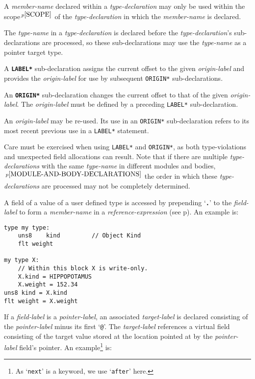 \documentclass[12pt]{article}
\newcommand{\TT}[1]{{\tt \bfseries #1}}
\newcommand{\ttkey}[1]{{\tt \bfseries #1}}
\newcommand{\pagref}[1]{p\pageref{#1}}
\newcommand{\pagnote}[1]{$\,^{p\pageref{#1}}$}
\newenvironment{indpar}[1][0.3in]%
	{\begin{list}{}%
		     {\setlength{\itemsep}{0in}%
		      \setlength{\topsep}{0in}%
		      \setlength{\parsep}{1ex}%
		      \setlength{\labelwidth}{#1}%
		      \setlength{\leftmargin}{#1}%
		      \addtolength{\leftmargin}{\labelsep}}%
	 \item}%
	{\end{list}}
\begin{document}
A {\em member-name} declared within a {\em type-declaration} may
only be used within the scope\pagnote{SCOPE} of the {\em type-declaration}
in which the {\em member-name} is declared.

The {\em type-name} in a {\em type-declaration} is declared before
the {\em type-declaration}'s sub-declarations are processed, so these
sub-declarations may use the {\em type-name} as a pointer target type.

A \ttkey{*LABEL*} sub-declaration assigns the current offset to the
given {\em origin-label} and provides the {\em origin-label}
for use by subsequent {\tt *ORIGIN*} sub-declarations.

An \ttkey{*ORIGIN*} sub-declaration changes the current offset to that
of the given {\em origin-label}.
The {\em origin-label} must be defined by a preceding
{\tt *LABEL*} sub-declaration.

An {\em origin-label} may be re-used.  Its use in an {\tt *ORIGIN*}
sub-declaration refers to its most recent previous use in a {\tt *LABEL*}
statement.

Care must be exercised when using {\tt *LABEL*} and {\tt *ORIGIN*},
as both type-violations and unexpected field allocations can result.
Note that if there are multiple {\em type-declarations}
with the same {\em type-name} in different
modules and bodies,\pagnote{MODULE-AND-BODY-DECLARATIONS}
the order in which these {\em type-declarations} are processed
may not be completely determined.

A field of a value of a user defined type is accessed by prepending
`\TT{.}' to the {\em field-label} to form a {\em member-name} in
a {\em reference-expression} (see \pagref{FIELD-SELECTION}).
An example is:

\begin{indpar}\begin{verbatim}
type my type:
    uns8    kind         // Object Kind
    flt weight

my type X:
    // Within this block X is write-only.
    X.kind = HIPPOPOTAMUS
    X.weight = 152.34
uns8 kind = X.kind
flt weight = X.weight
\end{verbatim}\end{indpar}

If a {\em field-label} is a {\em pointer-label}, an
associated {\em target-label} is declared consisting of the
{\em pointer-label} minus its first `{\tt @}'.  The {\em target-label}
references a virtual field consisting of the target value stored
at the location pointed at by the {\em pointer-label} field's pointer.
An example\footnote{As `{\tt next}' is a keyword, we use `{\tt after}'
here.} is:
\end{document}
